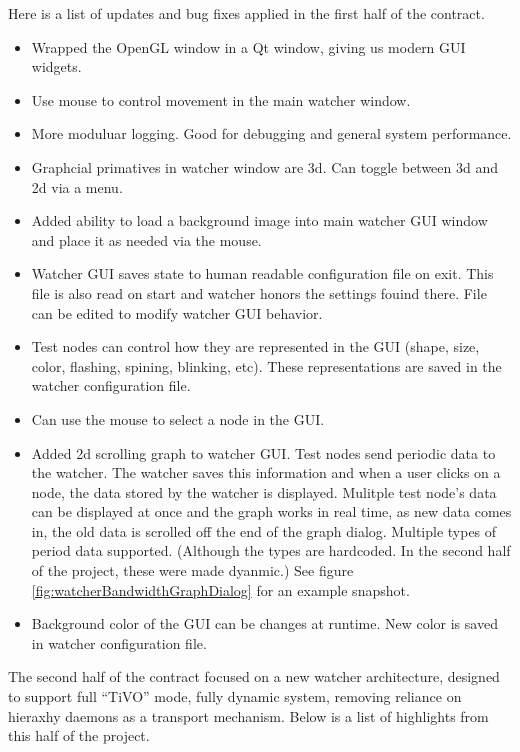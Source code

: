 \documentclass{report}
\begin{document}
Here is a list of updates and bug fixes applied in the first half of the contract.

\begin{itemize}
\item Wrapped the OpenGL window in a Qt window, giving us modern GUI widgets. 
\item Use mouse to control movement in the main watcher window.
\item More moduluar logging. Good for debugging and general system performance.
\item Graphcial primatives in watcher window are 3d. Can toggle between 3d and 2d via a menu.
\item Added ability to load a background image into main watcher GUI window and place it as needed via the mouse.
\item Watcher GUI saves state to human readable configuration file on exit. This file is also read on start and watcher honors the 
settings fouind there. File can be edited to modify watcher GUI behavior.
\item Test nodes can control how they are represented in the GUI (shape, size, color, flashing, spining, blinking, etc). These representations
are saved in the watcher configuration file.
\item Can use the mouse to select a node in the GUI.
\item Added 2d scrolling graph to watcher GUI. Test nodes send periodic data to the watcher. The watcher saves this information and when 
a user clicks on a node, the data stored by the watcher is displayed. Mulitple test node's data can be displayed at once and the graph
works in real time, as new data comes in, the old data is scrolled off the end of the graph dialog. Multiple types of period data 
supported. (Although the types are hardcoded. In the second half of the project, these were made dyanmic.) See figure \ref{fig:watcherBandwidthGraphDialog} 
for an example snapshot.
\item Background color of the GUI can be changes at runtime. New color is saved in watcher configuration file.
\end{itemize}

The second half of the contract focused on a new watcher architecture, designed to support full ``TiVO'' mode, fully dynamic system, removing reliance
on hieraxhy daemons as a transport mechanism. Below is a list of highlights from this half of the project.
\end{document}

